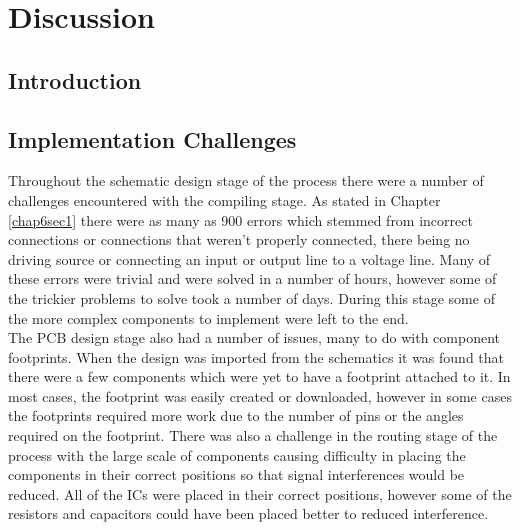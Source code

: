 
\chapter{Discussion} %

\label{Chapter7} %

\section{Introduction}

\section{Implementation Challenges}

	Throughout the schematic design stage of the process there were a number of challenges encountered with the compiling stage. 
As stated in Chapter \ref{chap6sec1} there were as many as 900 errors which stemmed from incorrect connections or connections that weren't properly connected, there being no driving source or connecting an input or output line to a voltage line. 
Many of these errors were trivial and were solved in a number of hours, however some of the trickier problems to solve took a number of days. 
During this stage some of the more complex components to implement were left to the end.\\

	The PCB design stage also had a number of issues, many to do with component footprints. 
When the design was imported from the schematics it was found that there were a few components which were yet to have a footprint attached to it. 
In most cases, the footprint was easily created or downloaded, however in some cases the footprints required more work due to the number of pins or the angles required on the footprint. 
There was also a challenge in the routing stage of the process with the large scale of components causing difficulty in placing the components in their correct positions so that signal interferences would be reduced. 
All of the ICs were placed in their correct positions, however some of the resistors and capacitors could have been placed better to reduced interference. \\


